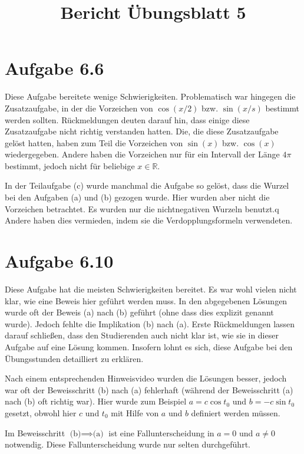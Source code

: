 \documentclass[a4paper]{article}
\title{Bericht Übungsblatt 5}
\date{}
\author{}
\newcommand*{\R}{\mathbb R}
\begin{document}
\maketitle

\section{Aufgabe 6.6}

Diese Aufgabe bereitete wenige Schwierigkeiten. Problematisch war hingegen die Zusatzaufgabe, in der die Vorzeichen von $\cos(x/2)$ bzw. $\sin(x/s)$ bestimmt werden sollten. Rückmeldungen deuten darauf hin, dass einige diese Zusatzaufgabe nicht richtig verstanden hatten. Die, die diese Zusatzaufgabe gelöst hatten, haben zum Teil die Vorzeichen von $\sin(x)$ bzw. $\cos(x)$ wiedergegeben. Andere haben die Vorzeichen nur für ein Intervall der Länge $4\pi$ bestimmt, jedoch nicht für beliebige $x\in\R$.

In der Teilaufgabe (c) wurde manchmal die Aufgabe so gelöst, dass die Wurzel bei den Aufgaben (a) und (b) gezogen wurde. Hier wurden aber nicht die Vorzeichen betrachtet. Es wurden nur die nichtnegativen Wurzeln benutzt.q Andere haben dies vermieden, indem sie die Verdopplungsformeln verwendeten.

\section{Aufgabe 6.10}

Diese Aufgabe hat die meisten Schwierigkeiten bereitet. Es war wohl vielen nicht klar, wie eine Beweis hier geführt werden muss. In den abgegebenen Lösungen wurde oft der Beweis (a) nach (b) geführt (ohne dass dies explizit genannt wurde). Jedoch fehlte die Implikation (b) nach (a). Erste Rückmeldungen lassen darauf schließen, dass den Studierenden auch nicht klar ist, wie sie in dieser Aufgabe auf eine Lösung kommen. Insofern lohnt es sich, diese Aufgabe bei den Übungsstunden detailliert zu erklären.

Nach einem entsprechenden Hinweisvideo wurden die Lösungen besser, jedoch war oft der Beweisschritt (b) nach (a) fehlerhaft (während der Beweisschritt (a) nach (b) oft richtig war). Hier wurde zum Beispiel $a=c \cos t_0$ und $b=-c\sin t_0$ gesetzt, obwohl hier $c$ und $t_0$ mit Hilfe von $a$ und $b$ definiert werden müssen.

Im Beweisschritt $\text{(b)} \implies \text{(a)}$ ist eine Fallunterscheidung in $a=0$ und $a\neq 0$ notwendig. Diese Fallunterscheidung wurde nur selten durchgeführt.
\end{document}

